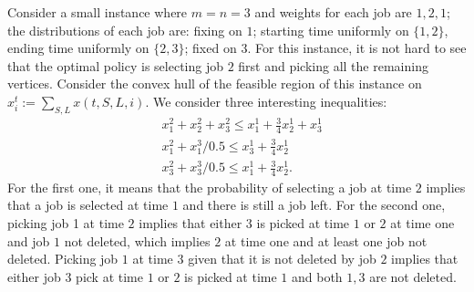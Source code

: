 \documentclass{article}
\begin{document}
Consider a small instance where $m=n=3$ and weights for each job are $1,2,1$; the distributions of each job are: fixing on $1$; starting time uniformly on $\{1,2\}$, ending time uniformly on $\{2,3\}$; fixed on $3$.
For this instance, it is not hard to see that the optimal policy is selecting job $2$ first and picking all the remaining vertices.
Consider the convex hull of the feasible region of this instance on $x_{i}^t:=\sum_{S,L}x(t,S,L,i)$.
We consider three interesting inequalities:
\begin{align*}
    &x_1^2+x_2^2+x_3^2\leq x_1^1+\frac{3}{4}x_2^1+x_3^1\\
    &x_1^2+x_1^3/0.5\leq x_3^1+\frac{3}{4}x_2^1\\
    &x_3^2+x_3^3/0.5\leq x_1^1+\frac{3}{4}x_2^1.
\end{align*}
For the first one, it means that the probability of selecting a job at time $2$ implies that a job is selected at time $1$ and there is still a job left.
For the second one, picking job 1 at time $2$ implies that either $3$ is picked at time $1$ or $2$ at time one and job $1$ not deleted, which implies $2$ at time one and at least one job not deleted.
Picking job $1$ at time $3$ given that it is not deleted by job $2$ implies that either job $3$ pick at time $1$ or $2$ is picked at time $1$ and both $1,3$ are not deleted.
\end{document}
